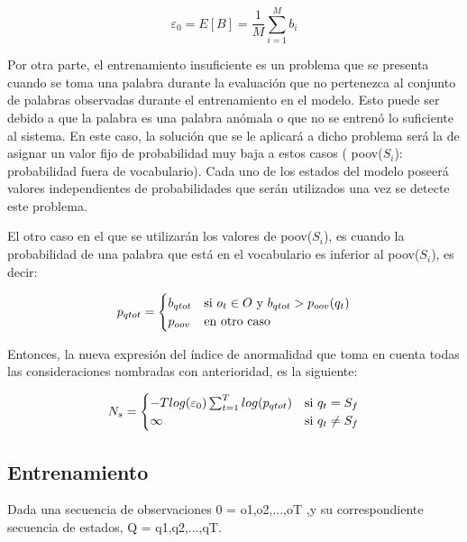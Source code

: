 \begin{equation}\label{eq:sumB}
\varepsilon_{0} = E[B] = \frac{1}{M}\sum_{i=1}^{M}b_{i}
\end{equation}

Por otra parte, el entrenamiento insuficiente es un problema que se presenta cuando se toma una palabra durante la evaluación que no pertenezca al conjunto de palabras observadas durante el entrenamiento en el modelo. Esto puede ser debido a que la palabra es una palabra anómala o que no se entrenó lo suficiente al sistema. En este caso, la solución que se le aplicará a dicho problema será la de asignar un valor fijo de probabilidad muy baja a estos casos ( poov($S_{i}$): probabilidad fuera de vocabulario). Cada uno de los estados del modelo poseerá valores independientes de probabilidades que serán utilizados una vez se detecte este problema.

El otro caso en el que se utilizarán los valores de poov($S_{i}$), es cuando la probabilidad de una palabra que está en el vocabulario es inferior al poov($S_{i}$), es decir:


\begin{equation}\label{eq:Pqtot}
p_{qtot} = 
	\begin{cases} 
      b_{qtot} & $si $  o_{t} \in O $ y $ b_{qtot} > p_{oov}(q_{t})\\
      p_{oov} & $en otro caso$ \\ 
   \end{cases}
\end{equation}


Entonces, la nueva expresión del índice de anormalidad que toma en cuenta todas las consideraciones nombradas con anterioridad, es la siguiente:

\begin{equation}\label{eq:Ns}
N_{s} = 
	\begin{cases} 
      -Tlog(\varepsilon_{0})\sum_{t=1}^{T}log(p_{qtot}) & $si $  q_{t} = S_{f} \\
      \infty & $si $  q_{t} \neq S_{f} \\ 
   \end{cases}
\end{equation}

\subsection*{Entrenamiento}

Dada una secuencia de observaciones 0 = o1,o2,...,oT ,y  su correspondiente secuencia de estados, Q = q1,q2,...,qT.

